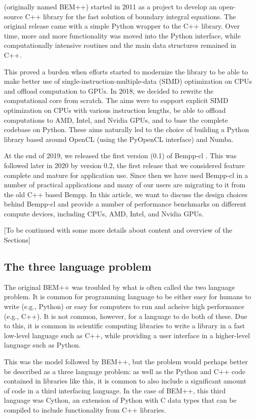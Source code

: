  (originally named BEM++) started in 2011 as a project to develop an open-source C++ library for the fast solution of boundary integral equations. The original release came with a simple Python wrapper to the C++ library. Over time, more and more functionality was moved into the Python interface, while computationally intensive routines and the main data structures remained in C++.

This proved a burden when efforts started to modernize the library to be able to make better use of single-instruction-multiple-data (SIMD) optimization on CPUs and offload computation to GPUs. In 2018, we decided to rewrite the computational core from scratch. The aims were to support explicit SIMD optimization on CPUs with various instruction lengths, be able to offload computations to AMD, Intel, and Nvidia GPUs, and to base the complete codebase on Python. These aims naturally led to the choice of building a Python library based around OpenCL (using the PyOpenCL interface) and Numba.

At the end of 2019, we released the first version (0.1) of Bempp-cl \cite{Bempp-cl}. This was followed later in 2020 by version 0.2, the first release that we considered feature complete and mature for application use. Since then we have used Bempp-cl in a number of practical applications and many of our users are migrating to it from the old C++ based Bempp. In this article, we want to discuss the design choices behind Bempp-cl and provide a number of performance benchmarks on different compute devices, including CPUs, AMD, Intel, and Nvidia GPUs.

[To be continued with some more details about content and overview of the Sections]

\subsection{The three language problem}
The original BEM++ was troubled by what is often called the two language problem. It is common for programming language to be either easy for humans to write (e.g., Python) or easy for computers to run and acheive high performance (e.g., C++). It is not common, however, for a language to do both of these. Due to this, it is common in scientific computing libraries to write a library in a fast low-level language such as C++, while providing a user interface in a higher-level language such as Python.

This was the model followed by BEM++, but the problem would perhaps better be described as a three language problem: as well as the Python and C++ code contained in libraries like this, it is common to also include a significant amount of code in a third interfacing language. In the case of BEM++, this third language was Cython, an extension of Python with C data types that can be compiled to include functionality from C++ libraries.

